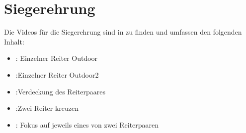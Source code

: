 \section{Siegerehrung}
Die Videos für die Sie­ger­eh­rung sind in \href{https://uni-muenster.sciebo.de/s/Vzc91AfPagtXTMK}{\color{blue}{hier}} zu finden und umfassen den folgenden Inhalt:
\begin{itemize}
\item  \href{https://uni-muenster.sciebo.de/s/5kyXkH1xph6GRwV}{\color{blue}{Video1}}:
Einzelner Reiter Outdoor

\item  \href{https://uni-muenster.sciebo.de/s/U7Tm0zdHa7TH6Ih}{\color{blue}{Video2}}:Einzelner Reiter Outdoor2

\item  \href{https://uni-muenster.sciebo.de/s/f3olU3QrQEITtXz}{\color{blue}{Video3}}:Verdeckung des Reiterpaares

\item  \href{https://uni-muenster.sciebo.de/s/SgQjESqBPDkkRzg}{\color{blue}{Video4}}:Zwei Reiter kreuzen 

\item  \href{https://uni-muenster.sciebo.de/s/1PTl9dlBgHArqcX}{\color{blue}{Video5}}:
Fokus auf jeweils eines von zwei Reiterpaaren
\end{itemize}
